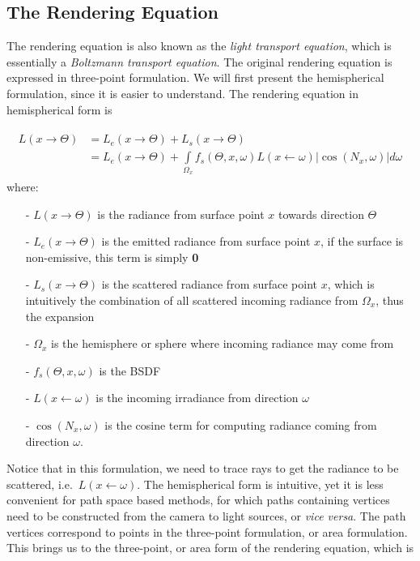 \documentclass[]{book}
\begin{document}
\subsection{The Rendering Equation}
\label{sec:GI:formulation:equation}
The rendering equation is also known as the \textit{light transport equation}, which is essentially a \textit{Boltzmann transport equation}.
The original rendering equation is expressed in three-point formulation.
We will first present the hemispherical formulation, since it is easier to understand.
The rendering equation in hemispherical form is

\begin{gather}
\label{eq:renderEquation:hemisphere}
\begin{aligned}
	L(x \rightarrow \Theta) &= L_{e}(x \rightarrow \Theta) + L_{s}(x \rightarrow \Theta) \\&= L_{e}(x \rightarrow \Theta) + \int\limits_{\Omega_{x}} f_{s}(\Theta, x, \omega) L(x \leftarrow \omega) \left | \cos(N_{x}, \omega)\right | d\omega
\end{aligned}
\end{gather}
where:
\begin{itemize}
	\item[-] $L(x \rightarrow \Theta)$ is the radiance from surface point $x$ towards direction $\Theta$
	\item[-] $L_{e}(x \rightarrow \Theta)$ is the emitted radiance from surface point $x$, if the surface is non-emissive, this term is simply \textbf{0}
	\item[-] $L_{s}(x \rightarrow \Theta)$ is the scattered radiance from surface point $x$, which is intuitively the combination of all scattered incoming radiance from $\Omega_{x}$, thus the expansion
	\item[-] $\Omega_{x}$ is the hemisphere or sphere where incoming radiance may come from
	\item[-] $f_{s}(\Theta, x, \omega)$ is the BSDF
	\item[-] $L(x \leftarrow \omega)$ is the incoming irradiance from direction $\omega$
	\item[-] $\cos(N_{x}, \omega)$ is the cosine term for computing radiance coming from direction $\omega$.
\end{itemize}

Notice that in this formulation, we need to trace rays to get the radiance to be scattered, i.e.\ $L(x \leftarrow \omega)$.
The hemispherical form is intuitive, yet it is less convenient for path space based methods, for which paths containing vertices need to be constructed from the camera to light sources, or \textit{vice versa}.
The path vertices correspond to points in the three-point formulation, or area formulation.
This brings us to the three-point, or area form of the rendering equation, which is
\end{document}
